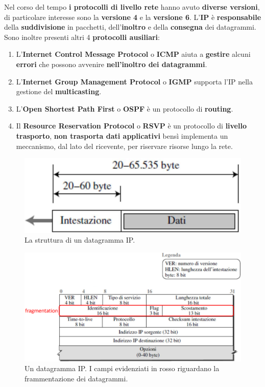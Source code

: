 \documentclass[11pt,a4paper,oneside]{book}
\theoremstyle{definition}
\begin{document}
Nel corso del tempo \textbf{i protocolli di livello rete} hanno avuto \textbf{diverse versioni}, di particolare interesse sono la \textbf{versione 4} e la \textbf{versione 6}.
L'\textbf{IP} è \textbf{responsabile} della \textbf{suddivisione} in pacchetti, dell'\textbf{inoltro} e della \textbf{consegna} dei datagrammi. Sono inoltre presenti altri 4 \textbf{protocolli ausiliari}:
\begin{enumerate}
	\item L'\textbf{Internet Control Message Protocol} o \textbf{ICMP} aiuta a \textbf{gestire} alcuni \textbf{errori} che possono avvenire \textbf{nell'inoltro dei datagrammi}.
	\item L'\textbf{Internet Group Management Protocol} o \textbf{IGMP} supporta l'IP nella gestione del \textbf{multicasting}.
	\item L'\textbf{Open Shortest Path First} o \textbf{OSPF} è un protocollo di \textbf{routing}.
	\item Il \textbf{Resource Reservation Protocol} o \textbf{RSVP} è un protocollo di \textbf{livello trasporto}, \textbf{non trasporta dati applicativi} bensì implementa un meccanismo, dal lato del ricevente, per riservare risorse lungo la rete.
\end{enumerate}

\begin{figure}[!h]
	\includegraphics[scale=0.25]{Immagini/Ip_d.png}
	\centering
	\caption{La struttura di un datagramma IP.}
\end{figure}

\pagebreak

\begin{figure}[!h]
	\includegraphics[scale=0.35]{Immagini/Ip_datagram.png}
	\centering
	\caption{Un datagramma IP. I campi evidenziati in rosso riguardano la frammentazione dei datagrammi.}
\end{figure}
\end{document}
